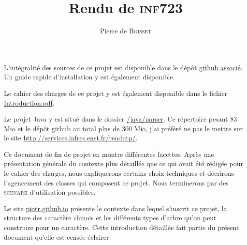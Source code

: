 \documentclass[12pt,onecolumn]{article}
\title{Rendu de \textsc{inf723}}
\author{Pierre de \textsc{Boisset}}
\begin{document}

\maketitle

L'intégralité des sources de ce projet est disponible dans le dépôt \href{https://github.com/piotr2b/chinese-huawen}{github associé}. Un guide rapide d'installation y est également disponible.

Le cahier des charges de ce projet y est également disponible dans le fichier \href{https://github.com/piotr2b/chinese-huawen/raw/master/documents/Introduction/Introduction.pdf}{Introduction.pdf}.

Le projet Java y est situé dans le dossier \href{https://github.com/piotr2b/chinese-huawen/tree/master/java/parser}{/java/parser}. Ce répertoire pesant 83 Mio et le dépôt github au total plus de 300 Mio, j'ai préféré ne pas le mettre sur le site \url{http://services.infres.enst.fr/rendutp/}.

Ce document de fin de projet en montre différentes facettes. Après une présentation générale du contexte plus détaillée que ce qui avait été rédigée pour le cahier des charges, nous expliquerons certains choix techniques et décrirons l'agencement des classes qui composent ce projet. Nous terminerons par des \textsc{scenarii} d'utilisation possibles.

Le site \url{piotr.github.io} présente le contexte dans lequel s'inscrit ce projet, la structure des caractère chinois et les différents types d'arbre qu'on peut construire pour un caractère. Cette introduction détaillée fait partie du présent document qu'elle est censée éclairer.
\end{document}
